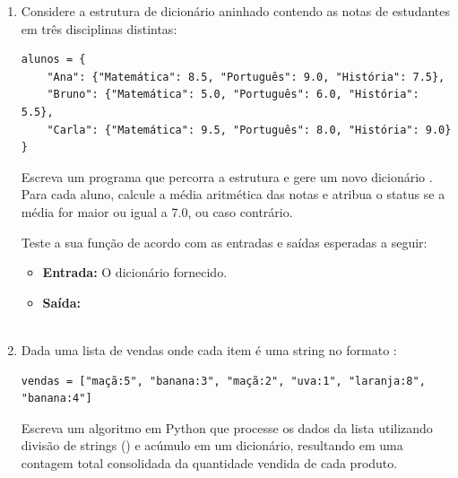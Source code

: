 \begin{enumerate}[label=\textbf{Q\arabic*.}]
\begin{itemize}
    \item \textbf{Entrada:} 
    \item \textbf{Saída:} \\
\end{itemize}




\item Considere a estrutura de dicionário aninhado contendo as notas de estudantes em três disciplinas distintas:

\begin{verbatim}
alunos = {
    "Ana": {"Matemática": 8.5, "Português": 9.0, "História": 7.5},
    "Bruno": {"Matemática": 5.0, "Português": 6.0, "História": 5.5},
    "Carla": {"Matemática": 9.5, "Português": 8.0, "História": 9.0}
}
\end{verbatim}

Escreva um programa que percorra a estrutura e gere um novo dicionário . Para cada aluno, calcule a média aritmética das notas e atribua o status  se a média for maior ou igual a 7.0, ou  caso contrário.

Teste a sua função de acordo com as entradas e saídas esperadas a seguir:

\begin{itemize}
    \item \textbf{Entrada:} O dicionário  fornecido.
    \item \textbf{Saída:} \\\\
\end{itemize}




\item Dada uma lista de vendas onde cada item é uma string no formato :
\begin{verbatim}
vendas = ["maçã:5", "banana:3", "maçã:2", "uva:1", "laranja:8", "banana:4"]
\end{verbatim}
Escreva um algoritmo em Python que processe os dados da lista utilizando divisão de strings () e acúmulo em um dicionário, resultando em uma contagem total consolidada da quantidade vendida de cada produto.


\end{enumerate}
